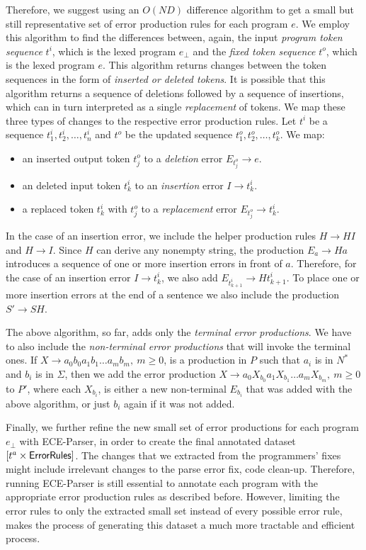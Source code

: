 Therefore, we suggest using an $O(ND)$ difference algorithm to get a small but
still representative set of error production rules for each program $e$. We
employ this algorithm to find the differences between, again, the input
\emph{program token sequence} $t^i$, which is the lexed program $e_{\bot}$ and
the \emph{fixed token sequence} $t^o$, which is the lexed program $e$. This
algorithm returns changes between the token sequences in the form of
\emph{inserted or deleted tokens}. It is possible that this algorithm returns a
sequence of deletions followed by a sequence of insertions, which can in turn
interpreted as a single \emph{replacement} of tokens. We map these three types
of changes to the respective error production rules. Let $t^i$ be a sequence
$t^i_1, t^i_2, \dots, t^i_n$ and $t^o$ be the updated sequence $t^o_1, t^o_2,
\dots, t^o_k$. We map:
\begin{itemize}
    \item an inserted output token $t^o_j$ to a \emph{deletion} error $E_{t^o_j}
    \rightarrow e$.
    \item an deleted input token $t^i_k$ to an \emph{insertion} error $I
    \rightarrow t^i_k$.
    \item a replaced token $t^i_k$ with $t^o_j$ to a \emph{replacement} error
    $E_{t^o_j} \rightarrow t^i_k$.
\end{itemize}

In the case of an insertion error, we include the helper production rules $H
\rightarrow HI$ and $H \rightarrow I$. Since $H$ can derive any nonempty string,
the production $E_a \rightarrow Ha$ introduces a sequence of one or more
insertion errors in front of $a$. Therefore, for the case of an insertion error
$I \rightarrow t^i_k$, we also add $E_{t^i_{k+1}} \rightarrow Ht^i_{k+1}$. To
place one or more insertion errors at the end of a sentence we also include the
production $S' \rightarrow SH$.

The above algorithm, so far, adds only the \emph{terminal error productions}. We
have to also include the \emph{non-terminal error productions} that will invoke
the terminal ones. If $X \rightarrow a_0b_0a_1b_1 \dots a_mb_m,\ m \geq 0$, is a
production in $P$ such that $a_i$ is in $N^*$ and $b_i$ is in $\Sigma$, then we
add the error production $X \rightarrow a_0X_{b_0}a_1X_{b_1} \dots a_mX_{b_m},\
m \geq 0$ to $P'$, where each $X_{b_i}$, is either a new non-terminal $E_{b_i}$
that was added with the above algorithm, or just $b_i$ again if it was not
added.

Finally, we further refine the new small set of error productions for each
program $e_{\bot}$ with ECE-Parser, in order to create the final annotated
dataset $[t^a \times \mathsf{ErrorRules}]$. The changes that we extracted from
the programmers' fixes might include irrelevant changes to the parse error fix,
\eg code clean-up. Therefore, running ECE-Parser is still essential to annotate
each program with the appropriate error production rules as described before.
However, limiting the error rules to only the extracted small set instead of
every possible error rule, makes the process of generating this dataset a much
more tractable and efficient process.


